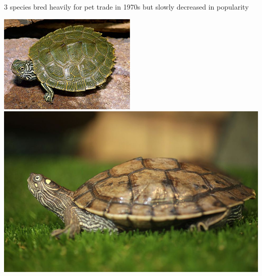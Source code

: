 \begin{center}
\begin{longtabu}
	3 species bred heavily for pet trade in 1970s but slowly decreased in popularity
	\\
	\hline
\end{longtabu}
 \includegraphics[scale=0.75]{testudines/emydidae/graptemys/1} 
\includegraphics[scale=0.2]{testudines/emydidae/graptemys/2}
\end{center}